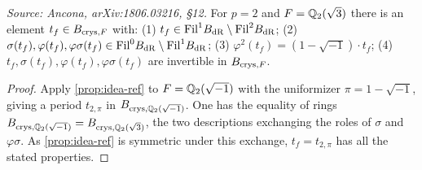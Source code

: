 \begin{proposition}[Period for \(F = \Q_2(\sqrt 3)\) (Colmez)]
  \label{prop:lubin-tate-wild2}
  \textit{Source: Ancona, arXiv:1806.03216, \S12.}
  For \(p = 2\) and \(F = \Q_2(\sqrt 3)\) there is an element
  \(t_f \in B_{\mathrm{crys},F}\) with:
  (1) \(t_f \in \mathrm{Fil}^1 B_{\mathrm{dR}} \setminus \mathrm{Fil}^2 B_{\mathrm{dR}}\);
  (2) \(\sigma(t_f), \varphi(t_f), \varphi\sigma(t_f) \in \mathrm{Fil}^0 B_{\mathrm{dR}} \setminus
  \mathrm{Fil}^1 B_{\mathrm{dR}}\);
  (3) \(\varphi^2(t_f) = (1 - \sqrt{-1}) \cdot t_f\);
  (4) \(t_f, \sigma(t_f), \varphi(t_f), \varphi\sigma(t_f)\) are invertible in
  \(B_{\mathrm{crys},F}\).
\end{proposition}

\begin{proof}
  Apply \cref{prop:idea-ref} to \(F = \mathbb{Q}_2(\sqrt{-1})\) with the uniformizer
  \(\pi = 1 - \sqrt{-1}\), giving a period \(t_{2,\pi}\) in
  \(B_{\mathrm{crys},\mathbb{Q}_2(\sqrt{-1})}\). One has the equality of rings
  \(B_{\mathrm{crys},\mathbb{Q}_2(\sqrt{-1})} = B_{\mathrm{crys},\mathbb{Q}_2(\sqrt 3)}\), the two descriptions
  exchanging the roles of \(\sigma\) and \(\varphi\sigma\). As
  \cref{prop:idea-ref} is symmetric under this exchange, \(t_f = t_{2,\pi}\) has
  all the stated properties.
\end{proof}

